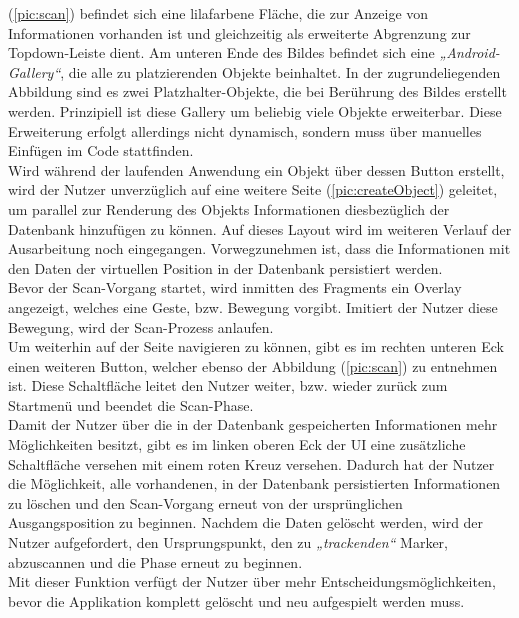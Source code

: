(\ref{pic:scan}) befindet sich eine lilafarbene Fläche, die zur Anzeige von Informationen vorhanden ist und gleichzeitig als erweiterte Abgrenzung 
zur Topdown-Leiste dient. Am unteren Ende des Bildes befindet sich eine \textit{„Android-Gallery“}, die alle zu platzierenden Objekte beinhaltet. In 
der zugrundeliegenden Abbildung sind es zwei Platzhalter-Objekte, die bei Berührung des Bildes erstellt werden. Prinzipiell ist diese Gallery um 
beliebig viele Objekte erweiterbar. Diese Erweiterung erfolgt allerdings nicht dynamisch, sondern muss über manuelles Einfügen im Code stattfinden. 
\\
Wird während der laufenden Anwendung ein Objekt über dessen Button erstellt, wird der Nutzer unverzüglich auf eine weitere Seite (\ref{pic:createObject}) 
geleitet, um parallel zur Renderung des Objekts Informationen diesbezüglich der Datenbank hinzufügen zu können. Auf dieses Layout wird im weiteren Verlauf der 
Ausarbeitung noch eingegangen. Vorwegzunehmen ist, dass die Informationen mit den Daten der virtuellen Position in der Datenbank persistiert werden.
\\ 
\linebreak 
Bevor der Scan-Vorgang startet, wird inmitten des Fragments ein Overlay angezeigt, welches eine Geste, bzw. Bewegung vorgibt. Imitiert der Nutzer 
diese Bewegung, wird der Scan-Prozess anlaufen.
\\ 
\linebreak
Um weiterhin auf der Seite navigieren zu können, gibt es im rechten unteren Eck einen weiteren Button, welcher ebenso der Abbildung (\ref{pic:scan}) 
zu entnehmen ist. Diese Schaltfläche leitet den Nutzer weiter, bzw. wieder zurück zum Startmenü und beendet die Scan-Phase. 
\\ 
\linebreak
Damit der Nutzer über die in der Datenbank gespeicherten Informationen mehr Möglichkeiten besitzt, gibt es im linken oberen Eck der \acs{UI} eine zusätzliche 
Schaltfläche versehen mit einem roten Kreuz versehen. Dadurch hat der Nutzer die Möglichkeit, alle vorhandenen, in der Datenbank persistierten Informationen zu 
löschen und den Scan-Vorgang erneut von der ursprünglichen Ausgangsposition zu beginnen. Nachdem die Daten gelöscht werden, wird der Nutzer aufgefordert, den 
Ursprungspunkt, den zu \textit{„trackenden“} Marker, abzuscannen und die Phase erneut zu beginnen. 
\\ 
Mit dieser Funktion verfügt der Nutzer über mehr Entscheidungsmöglichkeiten, bevor die Applikation komplett gelöscht und neu aufgespielt werden muss.
